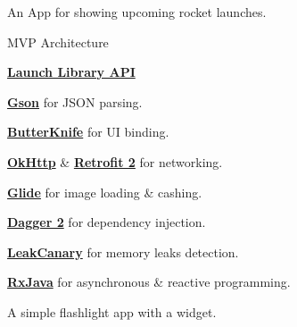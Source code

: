 \documentclass[]{deedy-resume}
\begin{document}
\begin{minipage}[t]{0.66\textwidth}
An App for showing upcoming rocket launches.
\begin{tightemize}
\item MVP Architecture
\item  \textbf{\href{http://http://launchlibrary.net/}{Launch Library API}}
\item \textbf{\href{http://github.com/google/gson}{Gson}} for JSON parsing.
\item \textbf{\href{http://jakewharton.github.io/butterknife/}{ButterKnife}} for UI binding.
\item \textbf{\href{http://square.github.io/okhttp}{OkHttp}} \& \textbf{\href{http://square.github.io/retrofit}{Retrofit 2}} for networking.
\item \textbf{\href{http://github.com/bumptech/glide}{Glide}} for image loading \& cashing.
\item \textbf{\href{http://github.com/google/dagger}{Dagger 2}} for dependency injection.
\item \textbf{\href{http://github.com/square/leakcanary}{LeakCanary}} for memory leaks detection.
\item \textbf{\href{http://github.com/ReactiveX/RxJava}{RxJava}} for asynchronous \& reactive programming.
\end{tightemize}
\sectionsep

A simple flashlight app with a widget.
\sectionsep



\end{minipage} 
\end{document}

